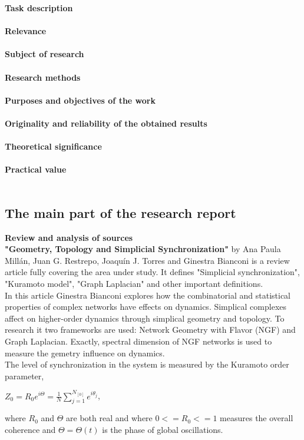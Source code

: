 \documentclass[draft]{article}
\newcommand\tab[1][1cm]{\hspace*{#1}}
\begin{document}
\textbf{Task description}\\
~\\
\textbf{Relevance}\\
~\\
\textbf{Subject of research}\\
~\\
\textbf{Research methods}\\
~\\
\textbf{Purposes and objectives of the work}\\
~\\
\textbf{Originality and reliability of the obtained results}\\
~\\
\textbf{Theoretical significance}\\
~\\
\textbf{Practical value}\\
~\\
\newpage
\begin{center}
\section {The main part of the research report}
\end{center}
\textbf{Review and analysis of sources}\\
\tab\textbf{"Geometry, Topology and Simplicial Synchronization"\cite{litlink3}} by Ana Paula Millán, Juan G. Restrepo, Joaquín J. Torres and Ginestra Bianconi is a review article fully covering the area under study. It defines "Simplicial synchronization", "Kuramoto model", "Graph Laplacian" and other important definitions. \\
\tab In this article Ginestra Bianconi explores how the combinatorial and statistical properties of complex networks have effects on dynamics. Simplical complexes affect on higher-order dynamics through simplical geometry and topology. To research it two frameworks are used: Network Geometry with Flavor (NGF) and Graph Laplacian. Exactly, spectral dimension of NGF networks is used to measure the gemetry influence on dynamics.\\
\tab The level of synchronization in the system is measured by the
Kuramoto order parameter,
\begin{center}
$Z_0 = R_0e^{i\Theta} = \frac{1}{N} \sum_{j=1}^{N_[0]}e^{i\theta _j}$,
\end{center}
where $R_0$ and $\Theta$ are both real and where $0<=R_0<=1$ measures the overall coherence and $\Theta = \Theta (t)$ is the phase of global oscillations.
\end{document}
